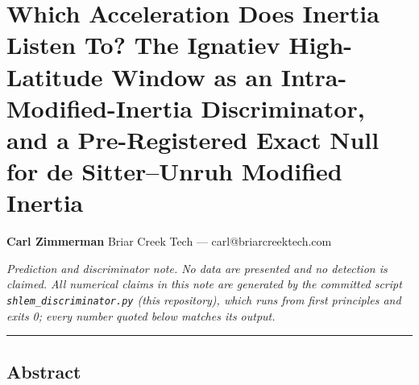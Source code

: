 \documentclass[
]{article}
\author{}
\date{}
\begin{document}
\section{Which Acceleration Does Inertia Listen To? The Ignatiev
High-Latitude Window as an Intra-Modified-Inertia Discriminator, and a
Pre-Registered Exact Null for de Sitter--Unruh Modified
Inertia}\label{which-acceleration-does-inertia-listen-to-the-ignatiev-high-latitude-window-as-an-intra-modified-inertia-discriminator-and-a-pre-registered-exact-null-for-de-sitterunruh-modified-inertia}

\textbf{Carl Zimmerman} Briar Creek Tech --- carl@briarcreektech.com

\emph{Prediction and discriminator note. No data are presented and no
detection is claimed. All numerical claims in this note are generated by
the committed script \texttt{shlem\_discriminator.py} (this repository),
which runs from first principles and exits 0; every number quoted below
matches its output.}

\begin{center}\rule{0.5\linewidth}{0.5pt}\end{center}

\subsection{Abstract}\label{abstract}
\end{document}
